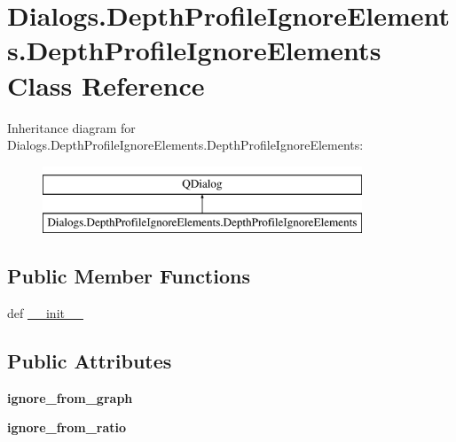 \hypertarget{classDialogs_1_1DepthProfileIgnoreElements_1_1DepthProfileIgnoreElements}{\section{Dialogs.\-Depth\-Profile\-Ignore\-Elements.\-Depth\-Profile\-Ignore\-Elements Class Reference}
\label{classDialogs_1_1DepthProfileIgnoreElements_1_1DepthProfileIgnoreElements}
}
Inheritance diagram for Dialogs.\-Depth\-Profile\-Ignore\-Elements.\-Depth\-Profile\-Ignore\-Elements\-:\begin{figure}[H]
\begin{center}
\leavevmode
\includegraphics[height=2.000000cm]{classDialogs_1_1DepthProfileIgnoreElements_1_1DepthProfileIgnoreElements}
\end{center}
\end{figure}
\subsection*{Public Member Functions}
\begin{DoxyCompactItemize}
\item 
def \hyperlink{classDialogs_1_1DepthProfileIgnoreElements_1_1DepthProfileIgnoreElements_a2c18d10b3c4462bb79816395b9518167}{\-\_\-\-\_\-init\-\_\-\-\_\-}
\end{DoxyCompactItemize}
\subsection*{Public Attributes}
\begin{DoxyCompactItemize}
\item 
\hypertarget{classDialogs_1_1DepthProfileIgnoreElements_1_1DepthProfileIgnoreElements_a3d157c0d198e9ac56a4b4af54912f11b}{{\bfseries ignore\-\_\-from\-\_\-graph}}\label{classDialogs_1_1DepthProfileIgnoreElements_1_1DepthProfileIgnoreElements_a3d157c0d198e9ac56a4b4af54912f11b}

\item 
\hypertarget{classDialogs_1_1DepthProfileIgnoreElements_1_1DepthProfileIgnoreElements_aa31c4b1d733784ddb515f79a75740a0e}{{\bfseries ignore\-\_\-from\-\_\-ratio}}\label{classDialogs_1_1DepthProfileIgnoreElements_1_1DepthProfileIgnoreElements_aa31c4b1d733784ddb515f79a75740a0e}

\end{DoxyCompactItemize}


